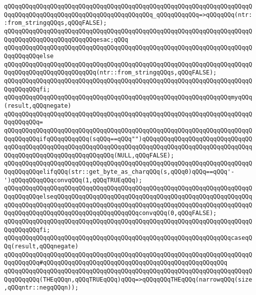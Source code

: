 \verb|qQQqqQQqqQQqqQQqqQQqqQQqqQQqqQQqqQQqqQQqqQQqqQQqqQQqqQQqqQQqqQQqqQQqqQQqqQQqqQQqqQQqqQQqqQQqqQQqqQQqqQQqqQQqqQQq_qQQqqQQqqQQq=>qQQqqQQq(ntr::from_stringqQQqs,qQQqFALSE);|\newline
\verb|qQQqqQQqqQQqqQQqqQQqqQQqqQQqqQQqqQQqqQQqqQQqqQQqqQQqqQQqqQQqqQQqqQQqqQQqqQQqqQQqqQQqqQQqqQQqqQQqesac;qQQq|\newline
\verb|qQQqqQQqqQQqqQQqqQQqqQQqqQQqqQQqqQQqqQQqqQQqqQQqqQQqqQQqqQQqqQQqqQQqqQQqqQQqqQQqelse|\newline
\verb|qQQqqQQqqQQqqQQqqQQqqQQqqQQqqQQqqQQqqQQqqQQqqQQqqQQqqQQqqQQqqQQqqQQqqQQqqQQqqQQqqQQqqQQqqQQqqQQq(ntr::from_stringqQQqs,qQQqFALSE);|\newline
\verb|qQQqqQQqqQQqqQQqqQQqqQQqqQQqqQQqqQQqqQQqqQQqqQQqqQQqqQQqqQQqqQQqqQQqqQQqqQQqqQQqfi;|\newline
\newline
\verb|qQQqqQQqqQQqqQQqqQQqqQQqqQQqqQQqqQQqqQQqqQQqqQQqqQQqqQQqqQQqqQQqmyqQQq(result,qQQqnegate)|\newline
\verb|qQQqqQQqqQQqqQQqqQQqqQQqqQQqqQQqqQQqqQQqqQQqqQQqqQQqqQQqqQQqqQQqqQQqqQQqqQQqqQQq=|\newline
\verb|qQQqqQQqqQQqqQQqqQQqqQQqqQQqqQQqqQQqqQQqqQQqqQQqqQQqqQQqqQQqqQQqqQQqqQQqqQQqqQQqifqQQqqQQqqQQq(sqQQq==qQQq"")qQQqqQQqqQQqqQQqqQQqqQQqqQQqqQQqqQQqqQQqqQQqqQQqqQQqqQQqqQQqqQQqqQQqqQQqqQQqqQQqqQQqqQQqqQQqqQQqqQQqqQQqqQQqqQQqqQQqqQQqqQQqqQQqqQQq(NULL,qQQqFALSE);|\newline
\verb|qQQqqQQqqQQqqQQqqQQqqQQqqQQqqQQqqQQqqQQqqQQqqQQqqQQqqQQqqQQqqQQqqQQqqQQqqQQqqQQqelifqQQq(str::get_byte_as_charqQQq(s,qQQq0)qQQq==qQQq'-')qQQqqQQqqQQqconvqQQq(1,qQQqTRUEqQQq);|\newline
\verb|qQQqqQQqqQQqqQQqqQQqqQQqqQQqqQQqqQQqqQQqqQQqqQQqqQQqqQQqqQQqqQQqqQQqqQQqqQQqqQQqelseqQQqqQQqqQQqqQQqqQQqqQQqqQQqqQQqqQQqqQQqqQQqqQQqqQQqqQQqqQQqqQQqqQQqqQQqqQQqqQQqqQQqqQQqqQQqqQQqqQQqqQQqqQQqqQQqqQQqqQQqqQQqqQQqqQQqqQQqqQQqqQQqqQQqqQQqqQQqqQQqqQQqconvqQQq(0,qQQqFALSE);|\newline
\verb|qQQqqQQqqQQqqQQqqQQqqQQqqQQqqQQqqQQqqQQqqQQqqQQqqQQqqQQqqQQqqQQqqQQqqQQqqQQqqQQqfi;|\newline
\newline
\verb|qQQqqQQqqQQqqQQqqQQqqQQqqQQqqQQqqQQqqQQqqQQqqQQqqQQqqQQqqQQqqQQqcaseqQQq(result,qQQqnegate)|\newline
\verb|qQQqqQQqqQQqqQQqqQQqqQQqqQQqqQQqqQQqqQQqqQQqqQQqqQQqqQQqqQQqqQQqqQQqqQQqqQQqqQQq#qQQqqQQqqQQqqQQqqQQqqQQqqQQqqQQqqQQqqQQqqQQqqQQqqQQq|\newline
\verb|qQQqqQQqqQQqqQQqqQQqqQQqqQQqqQQqqQQqqQQqqQQqqQQqqQQqqQQqqQQqqQQqqQQqqQQqqQQqqQQq(THEqQQqn,qQQqTRUEqQQq)qQQq=>qQQqqQQqTHEqQQq(narrowqQQq(size,qQQqntr::negqQQqn));|\newline

